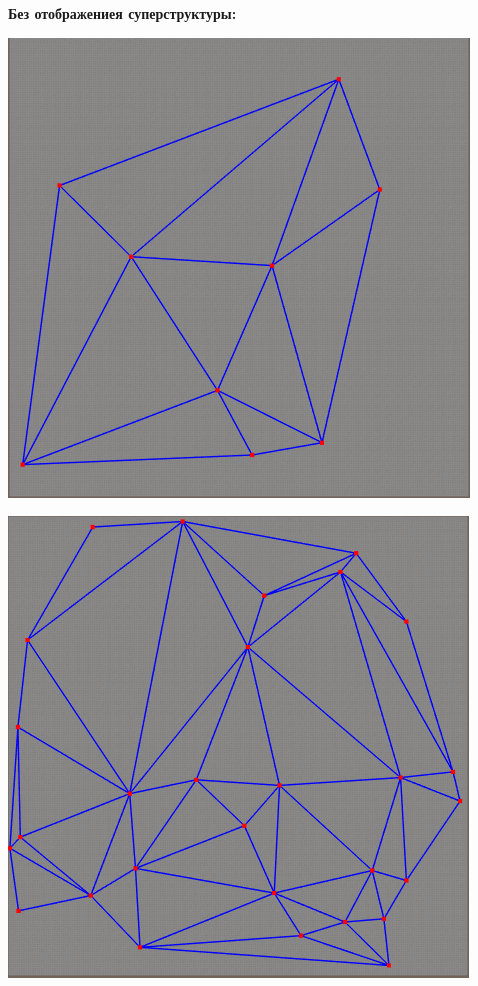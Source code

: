 \documentclass[a4paper, 12pt]{article}   	%
\begin{document}
    \textbf{Без отображениея суперструктуры:}
    \begin{center}
        \begin{minipage}{0.47\linewidth}
            \includegraphics[width=\linewidth]{img/triang_9}
        \end{minipage}
        \begin{minipage}{0.47\linewidth}
            \includegraphics[width=\linewidth]{img/triang_29}

\end{minipage}
\end{center}
\end{document}
